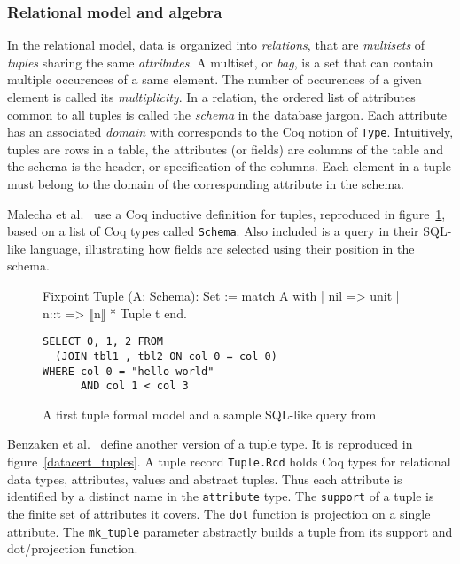 \documentclass[11pt]{article}
\def\coqe{\lstinline[language=Coq, basicstyle=\small]}
\begin{document}
\subsubsection{Relational model and algebra}
\label{relmodel}
In the relational model, data is organized into \emph{relations}, that are \emph{multisets} of \emph{tuples} sharing the same \emph{attributes}.
A multiset, or \emph{bag}, is a set that can contain multiple occurences of a same element. The number of occurences of a given element is called its \emph{multiplicity}.
In a relation, the ordered list of attributes common to all tuples is called the \emph{schema} in the database jargon.
Each attribute has an associated \emph{domain} with corresponds to the Coq notion of \coqe{Type}.
Intuitively, tuples are rows in a table, the attributes (or fields) are columns of the table and the schema is the header, or specification of the columns.
Each element in a tuple must belong to the domain of the corresponding attribute in the schema.

Malecha et al.~\cite{TVRDMS} use a Coq inductive definition for tuples, reproduced in figure~\ref{TVRDMS_tuple}, based on a list of Coq types called \coqe{Schema}.
Also included is a query in their SQL-like language, illustrating how fields are selected using their position in the schema.

\begin{figure}
\begin{minipage}{.45\textwidth}
  \begin{coq}
    Fixpoint Tuple (A: Schema): Set :=
    match A with
    | nil => unit
    | n::t => $\llbracket$n$\rrbracket$ * Tuple t
    end.
  \end{coq}
\end{minipage}\hfill
\begin{minipage}{.50\textwidth}
\begin{lstlisting}[basicstyle=\ttfamily\small]
SELECT 0, 1, 2 FROM
  (JOIN tbl1 , tbl2 ON col 0 = col 0)
WHERE col 0 = "hello world"
      AND col 1 < col 3
\end{lstlisting}
\end{minipage}
  \caption{A first tuple formal model and a sample SQL-like query from~\cite{TVRDMS}}
  \label{TVRDMS_tuple}
\end{figure}

Benzaken et al.~\cite{CFRDM} define another version of a tuple type. It is reproduced in figure~\ref{datacert_tuples}.
A tuple record \coqe{Tuple.Rcd} holds Coq types for relational data types, attributes, values and abstract tuples.
Thus each attribute is identified by a distinct name in the \coqe{attribute} type.
The \coqe{support} of a tuple is the finite set of attributes it covers. The \coqe{dot} function is projection on a single attribute.
The \coqe{mk_tuple} parameter abstractly builds a tuple from its support and dot/projection function.
\end{document}
